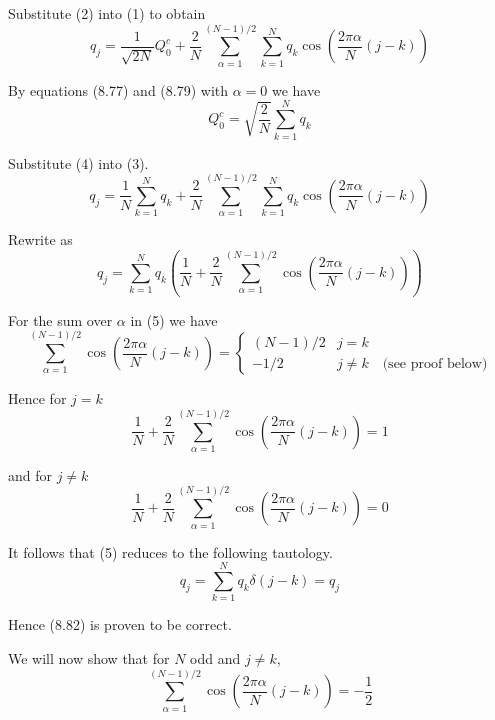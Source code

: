 \documentclass[12pt]{article}
\begin{document}
Substitute (2) into (1) to obtain
\begin{equation*}
q_j=
\frac{1}{\sqrt{2N}}Q_0^c
+
\frac{2}{N}
\sum_{\alpha=1}^{(N-1)/2}
\sum_{k=1}^N
q_k\cos\left(\frac{2\pi\alpha}{N}(j-k)\right)
\tag{3}
\end{equation*}

By equations (8.77) and (8.79) with $\alpha=0$ we have
\begin{equation*}
Q_0^c
=\sqrt{\frac{2}{N}}\sum_{k=1}^Nq_k
\tag{4}
\end{equation*}

Substitute (4) into (3).
\begin{equation*}
q_j=
\frac{1}{N}\sum_{k=1}^N q_k
+
\frac{2}{N}
\sum_{\alpha=1}^{(N-1)/2}
\sum_{k=1}^N
q_k\cos\left(\frac{2\pi\alpha}{N}(j-k)\right)
\end{equation*}

Rewrite as
\begin{equation*}
q_j=\sum_{k=1}^N q_k \left(
\frac{1}{N}+\frac{2}{N}\sum_{\alpha=1}^{(N-1)/2}
\cos\left(\frac{2\pi\alpha}{N}(j-k)\right)
\right)
\tag{5}
\end{equation*}

For the sum over $\alpha$ in (5) we have
\begin{equation*}
\sum_{\alpha=1}^{(N-1)/2}
\cos\left(\frac{2\pi\alpha}{N}(j-k)\right)
=\begin{cases}
(N-1)/2 & j=k
\\
-1/2 & j\ne k\quad\text{(see proof below)}
\end{cases}
\end{equation*}

Hence for $j=k$
\begin{equation*}
\frac{1}{N}+\frac{2}{N}\sum_{\alpha=1}^{(N-1)/2}
\cos\left(\frac{2\pi\alpha}{N}(j-k)\right)
=1
\end{equation*}

and for $j\ne k$
\begin{equation*}
\frac{1}{N}+\frac{2}{N}\sum_{\alpha=1}^{(N-1)/2}
\cos\left(\frac{2\pi\alpha}{N}(j-k)\right)
=0
\end{equation*}

It follows that (5) reduces to the following tautology.
\begin{equation*}
q_j=\sum_{k=1}^N q_k\delta(j-k)=q_j
\end{equation*}

Hence (8.82) is proven to be correct.

\bigskip
We will now show that for $N$ odd and $j\ne k$,
\begin{equation*}
\sum_{\alpha=1}^{(N-1)/2}
\cos\left(\frac{2\pi\alpha}{N}(j-k)\right)
=-\frac{1}{2}
\end{equation*}
\end{document}
